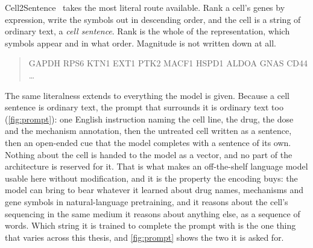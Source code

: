 \noindent
Cell2Sentence~\cite{c2s} takes the most literal route available. Rank a cell's
genes by expression, write the symbols out in descending order, and the cell is a
string of ordinary text, a \emph{cell sentence}. Rank is the whole of the
representation, which symbols appear and in what order. Magnitude is not written
down at all.

\begin{quote}
\ttfamily\small
GAPDH RPS6 KTN1 EXT1 PTK2 MACF1 HSPD1 ALDOA GNAS CD44 \dots
\end{quote}

The same literalness extends to everything the model is given. Because a cell
sentence is ordinary text, the prompt that surrounds it is ordinary text too
(\cref{fig:prompt}): one English instruction naming the cell line, the drug,
the dose and the mechanism annotation, then the untreated cell written as a
sentence, then an open-ended cue that the model completes with a sentence of its
own. Nothing about the cell is handed to the model as a vector, and no part of
the architecture is reserved for it. That is what makes an off-the-shelf
language model usable here without modification, and it is the property the
encoding buys: the model can bring to bear whatever it learned about drug names,
mechanisms and gene symbols in natural-language pretraining, and it reasons
about the cell's sequencing in the same medium it reasons about anything else,
as a sequence of words. Which string it is trained to complete the prompt with
is the one thing that varies across this thesis, and \cref{fig:prompt} shows the
two it is asked for.

\begin{figure}[htbp]
\begin{lrbox}{\tvfb}%
%
\end{lrbox}
\end{figure}


